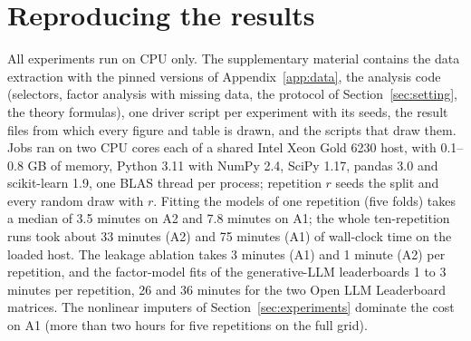 \section{Reproducing the results}
\label{app:repro}
All experiments run on CPU only.
The supplementary material contains the data extraction with the pinned versions of Appendix~\ref{app:data}, the analysis code (selectors, factor analysis with missing data, the protocol of Section~\ref{sec:setting}, the theory formulas), one driver script per experiment with its seeds, the result files from which every figure and table is drawn, and the scripts that draw them.
Jobs ran on two CPU cores each of a shared Intel Xeon Gold 6230 host, with 0.1--0.8 GB of memory, Python 3.11 with NumPy 2.4, SciPy 1.17, pandas 3.0 and scikit-learn 1.9, one BLAS thread per process; repetition $r$ seeds the split and every random draw with $r$.
Fitting the models of one repetition (five folds) takes a median of 3.5 minutes on A2 and 7.8 minutes on A1; the whole ten-repetition runs took about 33 minutes (A2) and 75 minutes (A1) of wall-clock time on the loaded host.
The leakage ablation takes 3 minutes (A1) and 1 minute (A2) per repetition, and the factor-model fits of the generative-LLM leaderboards 1 to 3 minutes per repetition, 26 and 36 minutes for the two Open LLM Leaderboard matrices.
The nonlinear imputers of Section~\ref{sec:experiments} dominate the cost on A1 (more than two hours for five repetitions on the full grid).
